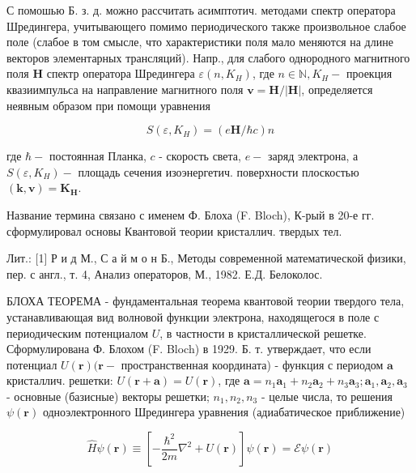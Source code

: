 \documentclass[10pt]{article}
\begin{document}
С помошью Б. з. д. можно рассчитать асимптотич. методами спектр оператора Шредингера, учитывающего помимо периодического также произвольное слабое поле (слабое в том смысле, что характеристики поля мало меняются на длине векторов элементарных трансляций). Напр., для слабого однородного магнитного поля $\boldsymbol{H}$ спектр оператора Шредингера $\varepsilon\left(n, K_{H}\right)$, где $n \in \mathbb{N}, K_{H}-$ проекция квазиимпульса на направление магнитного поля $\boldsymbol{v}=\boldsymbol{H} /|\boldsymbol{H}|$, определяется неявным образом при помощи уравнения



\[

S\left(\varepsilon, K_{H}\right)=(e \boldsymbol{H} / \hbar c) n

\]



где $\hbar-$ постоянная Планка, $c$ - скорость света, $e-$ заряд электрона, а $S\left(\varepsilon, K_{H}\right)-$ площадь сечения изоэнергетич. поверхности плоскостью $(\boldsymbol{k}, \boldsymbol{v})=\boldsymbol{K}_{\boldsymbol{H}}$.



Название термина связано с именем Ф. Блоха (F. Bloch), К-рый в 20-е гг. сформулировал основы Квантовой теории кристаллич. твердых тел.



Лит.: [1] Р и д М., С а й м о н Б., Методы современной математической физики, пер. с англ., т. 4, Анализ операторов, М., 1982. Е.Д. Белоколос.



БЛОХА ТЕОРЕМА - фундаментальная теорема квантовой теории твердого тела, устанавливающая вид волновой функции электрона, находящегося в поле с периодическим потенциалом $U$, в частности в кристаллической решетке. Сформулирована Ф. Блохом (F. Bloch) в 1929. Б. т. утверждает, что если потенциал $U(\boldsymbol{r})(\boldsymbol{r}-$ пространственная координата) - функция с периодом $\boldsymbol{a}$ кристаллич. решетки: $U(\boldsymbol{r}+\boldsymbol{a})=U(\boldsymbol{r})$, где $\boldsymbol{a}=n_{1} \boldsymbol{a}_{1}+n_{2} \boldsymbol{a}_{2}+n_{3} \boldsymbol{a}_{3} ; \boldsymbol{a}_{1}, \boldsymbol{a}_{2}, \boldsymbol{a}_{3}$ - основные (базисные) векторы решетки; $n_{1}, n_{2}, n_{3}$ - целые числа, то решения $\psi(\boldsymbol{r})$ одноэлектронного Шредингера уравнения (адиабатическое приближение)



\[

\hat{H} \psi(\boldsymbol{r}) \equiv\left[-\frac{\hbar^{2}}{2 m} \nabla^{2}+U(\boldsymbol{r})\right] \psi(\boldsymbol{r})=\mathscr{E} \psi(\boldsymbol{r})

\]
\end{document}
